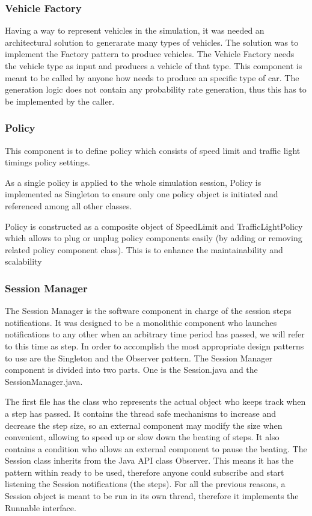 \documentclass[11pt]{article}
\begin{document}
\subsubsection{Vehicle Factory}
Having a way to represent vehicles in the simulation, it was needed an architectural solution to generarate many types of vehicles. The solution was to implement the Factory pattern to produce vehicles. The Vehicle Factory needs the vehicle type as input and produces a vehicle of that type.
This component is meant to be called by anyone how needs to produce an specific type of car. The generation logic does not contain any probability rate generation, thus this has to be implemented by the caller.

\subsubsection{Policy}        


This component is to define policy which consists of speed limit and traffic light timings policy settings.

As a single policy is applied to the whole simulation session, Policy is implemented as Singleton to ensure only one policy object is initiated and referenced among all other classes. 
 
Policy is constructed as a composite object of SpeedLimit and TrafficLightPolicy which allows to plug or unplug policy components easily (by adding or removing related policy component class). This is to enhance the maintainability and scalability

\subsubsection{Session Manager}
The Session Manager is the software component in charge of the session steps notifications. 
It was designed to be a monolithic component who launches notifications to any other when an arbitrary time period has passed, we will refer to this time as step. In order to accomplish the most appropriate design patterns to use are the Singleton and the Observer pattern.
The Session Manager component is divided into two parts. One is the Session.java and the SessionManager.java.

The first file has the class who represents the actual object who keeps track when a step has passed. It contains the thread safe mechanisms to increase and decrease the step size, so an external component may modify the size when convenient, allowing to speed up or slow down the beating of steps. It also contains a condition who allows an external component to pause the beating. The Session class inherits from the Java API class Observer. This means it has the pattern within ready to be used, therefore anyone could subscribe and start listening the Session notifications (the steps). For all the previous reasons, a Session object is meant to be run in its own thread, therefore it implements the Runnable interface.
\end{document}
